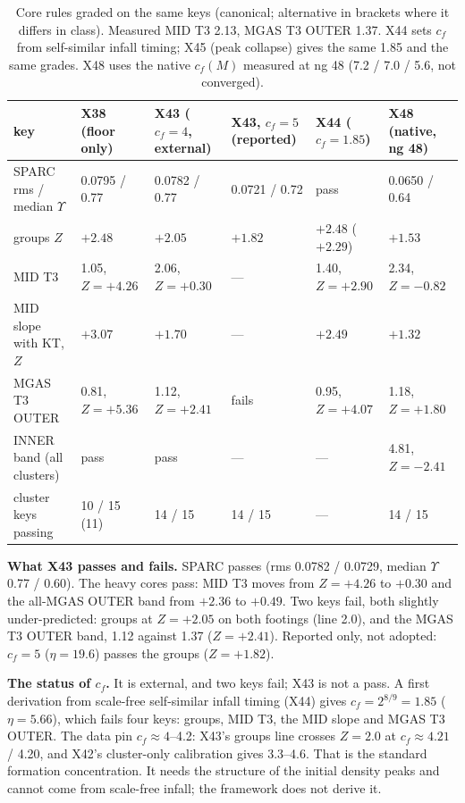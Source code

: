 \documentclass[10pt]{article}
\begin{document}
\begin{table}[h]\centering\footnotesize
\caption{Core rules graded on the same keys (canonical; alternative in brackets where it differs in class). Measured MID T3 2.13, MGAS T3 OUTER 1.37. X44 sets $c_f$ from self-similar infall timing; X45 (peak collapse) gives the same 1.85 and the same grades. X48 uses the native $c_f(M)$ measured at ng 48 (7.2 / 7.0 / 5.6, not converged).}\label{tab:core}
\setlength{\tabcolsep}{3pt}
\begin{tabular}{llllll}
\toprule
key & X38 (floor only) & X43 ($c_f=4$, external) & X43, $c_f=5$ (reported) & X44 ($c_f=1.85$) & X48 (native, ng 48)\\
\midrule
SPARC rms / median $\Upsilon$ & 0.0795 / 0.77 & 0.0782 / 0.77 & 0.0721 / 0.72 & pass & 0.0650 / 0.64\\
groups $Z$ & $+2.48$ & $+2.05$ & $+1.82$ & $+2.48$ ($+2.29$) & $+1.53$\\
MID T3 & 1.05, $Z=+4.26$ & 2.06, $Z=+0.30$ & --- & 1.40, $Z=+2.90$ & 2.34, $Z=-0.82$\\
MID slope with KT, $Z$ & $+3.07$ & $+1.70$ & --- & $+2.49$ & $+1.32$\\
MGAS T3 OUTER & 0.81, $Z=+5.36$ & 1.12, $Z=+2.41$ & fails & 0.95, $Z=+4.07$ & 1.18, $Z=+1.80$\\
INNER band (all clusters) & pass & pass & --- & --- & 4.81, $Z=-2.41$\\
cluster keys passing & 10 / 15 (11) & 14 / 15 & 14 / 15 & --- & 14 / 15\\
\bottomrule
\end{tabular}
\end{table}

\textbf{What X43 passes and fails.} SPARC passes (rms 0.0782 / 0.0729, median $\Upsilon$ 0.77 / 0.60). The heavy cores pass: MID T3 moves from $Z=+4.26$ to $+0.30$ and the all-MGAS OUTER band from $+2.36$ to $+0.49$. Two keys fail, both slightly under-predicted: groups at $Z=+2.05$ on both footings (line 2.0), and the MGAS T3 OUTER band, 1.12 against 1.37 ($Z=+2.41$). Reported only, not adopted: $c_f=5$ ($\eta=19.6$) passes the groups ($Z=+1.82$).

\textbf{The status of $c_f$.} It is external, and two keys fail; X43 is not a pass. A first derivation from scale-free self-similar infall timing (X44) gives $c_f=2^{8/9}=1.85$ ($\eta=5.66$), which fails four keys: groups, MID T3, the MID slope and MGAS T3 OUTER. The data pin $c_f\approx4$--4.2: X43's groups line crosses $Z=2.0$ at $c_f\approx4.21$ / 4.20, and X42's cluster-only calibration gives 3.3--4.6. That is the standard formation concentration. It needs the structure of the initial density peaks and cannot come from scale-free infall; the framework does not derive it.
\end{document}
